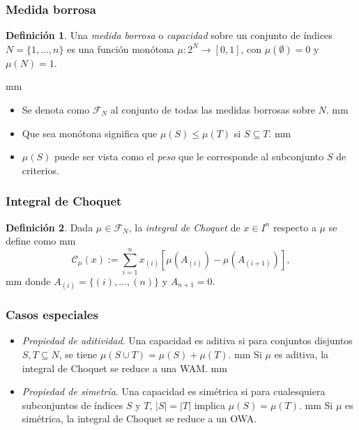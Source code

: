 \documentclass{beamer}
\theoremstyle{definition}
\newtheorem{Def}{Definición}
\begin{document}
\begin{frame}
  \frametitle{Medida borrosa}
  \begin{Def}
    Una \emph {medida borrosa} o \emph{capacidad} sobre un conjunto de
    índices $N=\{1,\ldots ,n \}$ es una función monótona
    $\mu :2^N \to [0,1]$, con $\mu(\emptyset)=0$ y $\mu(N)=1$.
  \end{Def}
   mm
  \begin{itemize}
  \item Se denota como $\mathcal F_N$ al conjunto de todas las medidas
    borrosas sobre $N$.   mm
  \item Que sea monótona significa que $\mu (S) \le \mu (T)$ si
    $S\subseteq T$.   mm
  \item $\mu (S)$ puede ser vista como el \emph{peso} que le
    corresponde al subconjunto $S$ de criterios.
  \end{itemize}
\end{frame}

\begin{frame}
  \frametitle{Integral de Choquet}
  \begin{Def}
    Dada $\mu \in \mathcal F_N$, la \emph {integral de Choquet} de
    $x \in I^n$ respecto a $\mu$ se define como  mm
      $$
      \mathcal C_{\mu}(x):=\sum _{i=1}^n x_{(i)}[\mu (A_{(i)})-\mu
      (A_{(i+1)})],
      $$
       mm donde $A_{(i)}=\{ (i),\ldots ,(n)\}$ y $A_{n+1}=0$.
    \end{Def}
  \end{frame}

  \begin{frame}
    \frametitle{Casos especiales}
    \begin{itemize}
    \item \emph {Propiedad de aditividad}. Una capacidad es aditiva si
      para conjuntos disjuntos $S, T \subseteq N$, se tiene
      $\mu (S \cup T)=\mu (S)+\mu (T)$.  
       mm 
      \alert{Si $\mu$ es aditiva, la integral de Choquet se reduce a
      una WAM.}   mm
    \item \emph {Propiedad de simetría}. Una capacidad es simétrica si
      para cualesquiera subconjuntos de índices $S$ y $T$, $|S|=|T|$
      implica $\mu (S)=\mu (T)$.  
       mm 
      \alert{Si $\mu$
      es simétrica, la integral de Choquet se reduce a un OWA.}
    \end{itemize}
  \end{frame}
\end{document}
